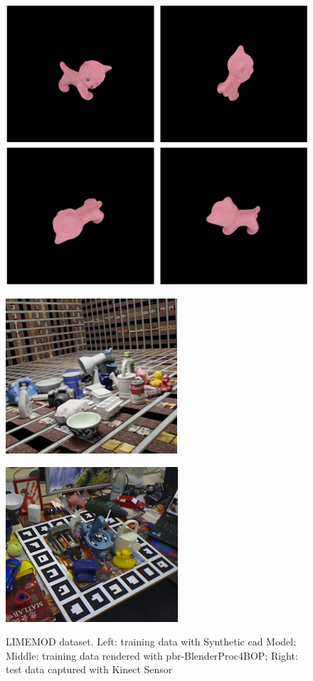 \documentclass[12pt,DIV14,BCOR12mm,a4paper,footinclude=false,headinclude,parskip=half-,twoside,openright,cleardoublepage=empty,toc=index,bibliography=totoc,listof=totoc]{scrreprt}
\numberwithin{equation}{chapter}
\begin{document}
\begin{figure}[h]
  \centering
  \begin{minipage}{.33\textwidth}
    \centering
    \includegraphics[scale=.588]{img/syn.png}
    \label{img:linemod_syn}
  \end{minipage}%
  \begin{minipage}{.33\textwidth}
    \centering
    \includegraphics[scale=.588]{img/pbr.png}
    \label{img:linemod_pbr}
  \end{minipage}%
  \begin{minipage}{.33\textwidth}
    \centering
    \includegraphics[scale=.588]{img/kine.png}
    \label{img:linemod_kine}
  \end{minipage}
  \caption{LIMEMOD dataset. Left: training data with Synthetic \gls{cad} Model; Middle: training data rendered with \gls{pbr}-BlenderProc4BOP; Right: test data captured with Kinect Sensor}
  \label{img:linemod}
\end{figure}
\end{document}
